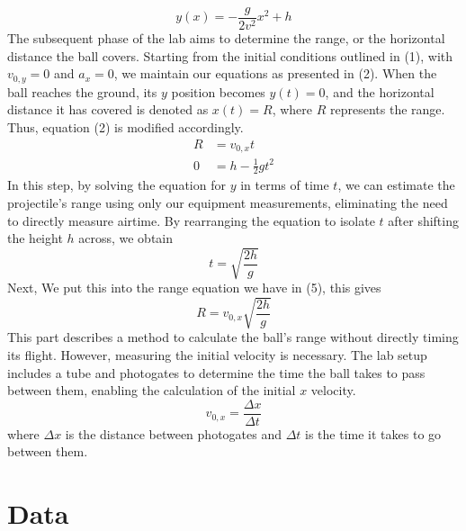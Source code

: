 \documentclass{report}
\begin{document}
    \bigbreak \noindent 
    \begin{equation}
       y(x) = -\frac{g}{2v^{2}} x^{2} + h
    \end{equation}
    \bigbreak \noindent 
    The subsequent phase of the lab aims to determine the range, or the horizontal distance the ball covers. Starting from the initial conditions outlined in (1), with $v_{0,y} = 0$ and $a_x = 0$, we maintain our equations as presented in (2). When the ball reaches the ground, its $y$ position becomes $y(t) = 0$, and the horizontal distance it has covered is denoted as $x(t) = R$, where $R$ represents the range. Thus, equation (2) is modified accordingly.
    \begin{equation}
       \begin{split}
           R &= v_{0,x}t \\
           0 &= h-\frac{1}{2}gt^{2}
       \end{split}
    \end{equation}
    \bigbreak \noindent 
    In this step, by solving the equation for $y$ in terms of time $t$, we can estimate the projectile's range using only our equipment measurements, eliminating the need to directly measure airtime. By rearranging the equation to isolate $t$ after shifting the height $h$ across, we obtain
    \begin{equation}
       t = \sqrt{\frac{2h}{g}} 
    \end{equation}
    \bigbreak \noindent 
    Next, We put this into the range equation we have in (5), this gives 
    \begin{equation}
       R = v_{0,x}\sqrt{\frac{2h}{g}} 
    \end{equation}
    \bigbreak \noindent 
    This part describes a method to calculate the ball's range without directly timing its flight. However, measuring the initial velocity is necessary. The lab setup includes a tube and photogates to determine the time the ball takes to pass between them, enabling the calculation of the initial $x$ velocity.
    \begin{equation}
       v_{0,x}  = \frac{\Delta x}{\Delta t}
    \end{equation}
    \bigbreak \noindent 
    where $\Delta x$ is the distance between photogates and $\Delta t$ is the time it takes to go between them.

    \bigbreak \noindent 
    \section{Data}
    \bigbreak \noindent 
\end{document}
